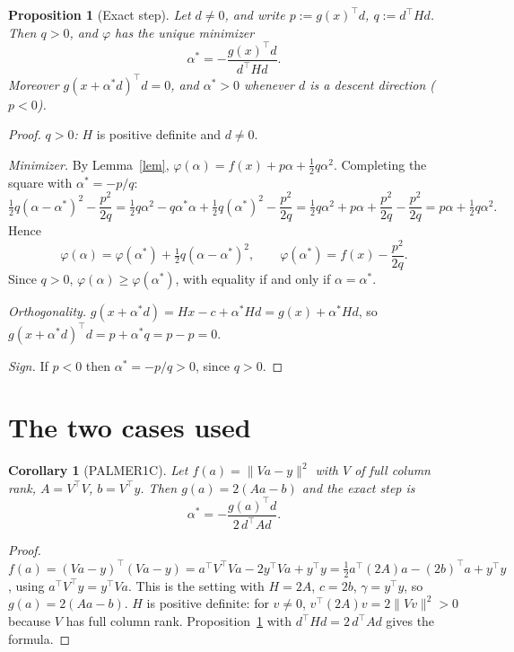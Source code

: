 \documentclass[11pt]{article}
\newtheorem{proposition}{Proposition}
\newtheorem{corollary}{Corollary}
\begin{document}
\begin{proposition}[Exact step]\label{prop}
Let $d\ne0$, and write $p:=g(x)^{\top}d$, $q:=d^{\top}Hd$. Then $q>0$, and
$\varphi$ has the unique minimizer
\[
\alpha^\ast=-\frac{g(x)^{\top}d}{d^{\top}Hd}.
\]
Moreover $g(x+\alpha^\ast d)^{\top}d=0$, and $\alpha^\ast>0$ whenever $d$ is a
descent direction ($p<0$).
\end{proposition}

\begin{proof}
\emph{$q>0$:} $H$ is positive definite and $d\ne0$.

\emph{Minimizer.} By Lemma~\ref{lem}, $\varphi(\alpha)=f(x)+p\alpha+\tfrac12q\alpha^2$.
Completing the square with $\alpha^\ast=-p/q$:
\[
\tfrac12q(\alpha-\alpha^\ast)^2-\frac{p^2}{2q}
=\tfrac12q\alpha^2-q\alpha^\ast\alpha+\tfrac12q(\alpha^\ast)^2-\frac{p^2}{2q}
=\tfrac12q\alpha^2+p\alpha+\frac{p^2}{2q}-\frac{p^2}{2q}
=p\alpha+\tfrac12q\alpha^2 .
\]
Hence
\[
\varphi(\alpha)=\varphi(\alpha^\ast)+\tfrac12q(\alpha-\alpha^\ast)^2,\qquad
\varphi(\alpha^\ast)=f(x)-\frac{p^2}{2q}.
\]
Since $q>0$, $\varphi(\alpha)\ge\varphi(\alpha^\ast)$, with equality if and only
if $\alpha=\alpha^\ast$.

\emph{Orthogonality.} $g(x+\alpha^\ast d)=Hx-c+\alpha^\ast Hd=g(x)+\alpha^\ast Hd$, so
$g(x+\alpha^\ast d)^{\top}d=p+\alpha^\ast q=p-p=0$.

\emph{Sign.} If $p<0$ then $\alpha^\ast=-p/q>0$, since $q>0$.
\end{proof}

\section{The two cases used}

\begin{corollary}[PALMER1C]\label{cor:palmer}
Let $f(a)=\|Va-y\|^2$ with $V$ of full column rank, $A=V^{\top}V$, $b=V^{\top}y$.
Then $g(a)=2(Aa-b)$ and the exact step is
\[
\alpha^\ast=-\frac{g(a)^{\top}d}{2\,d^{\top}Ad}.
\]
\end{corollary}

\begin{proof}
$f(a)=(Va-y)^{\top}(Va-y)=a^{\top}V^{\top}Va-2y^{\top}Va+y^{\top}y
=\tfrac12a^{\top}(2A)a-(2b)^{\top}a+y^{\top}y$, using $a^{\top}V^{\top}y=y^{\top}Va$.
This is the setting with $H=2A$, $c=2b$, $\gamma=y^{\top}y$, so $g(a)=2(Aa-b)$.
$H$ is positive definite: for $v\ne0$, $v^{\top}(2A)v=2\|Vv\|^2>0$ because
$V$ has full column rank. Proposition~\ref{prop} with $d^{\top}Hd=2\,d^{\top}Ad$
gives the formula.
\end{proof}
\end{document}
